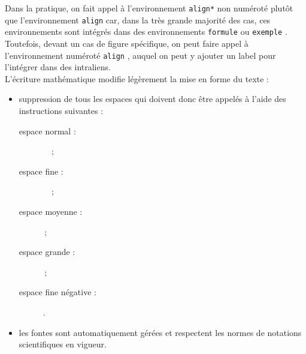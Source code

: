 \documentclass[a4paper, 11pt, twoside, fleqn]{memoir}
\begin{document}
Dans la pratique, on fait appel à l'environnement \texttt{align*} non numéroté plutôt que l'environnement \texttt{align} car, dans la très grande majorité des cas, ces environnements sont intégrés dans des environnements \texttt{formule} ou \texttt{exemple} . Toutefois, devant un cas de figure spécifique, on peut faire appel à l'environnement numéroté \texttt{align} , auquel on peut y ajouter un label pour l'intégrer dans des intraliens.\\

L'écriture mathématique modifie légèrement la mise en forme du texte :
\begin{itemize}
\item suppression de tous les espaces qui doivent donc être appelés à l'aide des instructions suivantes :
	\begin{multicols}{2}
		\begin{description}
		\item [espace normal :] \texttt{\ } \,;
		\item [espace fine :] \texttt{\,} \,;
		\item [espace moyenne :] \texttt{\:} \,;
		\item [espace grande :] \texttt{\;} \,;
		\item [espace fine négative :] \texttt{\!} .
		\end{description}
	\end{multicols}
\item les fontes sont automatiquement gérées et respectent les normes de notations scientifiques en vigueur.
\end{itemize}
\end{document}
